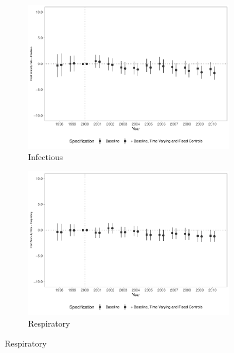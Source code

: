 \begin{figure}[h!]
    \begin{center}
    \caption{Effects on Infant Mortality Rates - By Cause}\label{fig:18}
    \begin{subfigure}{0.32\textwidth}
        \caption{\scriptsize Infectious}\label{fig:18a}
        \centering
        \includegraphics[width=\textwidth]{plots/tx_mi_infec_dist_ec29_baseline_dist_ec29_baseline_18.pdf}
    \end{subfigure}
    \begin{subfigure}{0.32\textwidth}
        \centering
        \caption{\scriptsize Respiratory}\label{fig:18b}
        \includegraphics[width=\textwidth]{plots/tx_mi_resp_dist_ec29_baseline_dist_ec29_baseline_18.pdf}
    \end{subfigure}

\end{center}
\end{figure}
